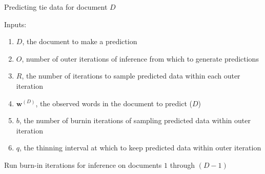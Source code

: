         \begin{algorithm}[H]
        	\SetAlgoLined
        	\caption{Predicting tie data for document $D$}
       	Inputs:
       	\begin{enumerate}
       		\item $D$, the document to make a prediction
       		\item $O$, number of outer iterations of inference from which to generate predictions
       		\item $R$, the number of iterations to sample predicted data within each outer iteration
       		\item $\boldsymbol{w}^{(D)}$, the observed words in the document to predict ($D$)
       		\item $b$, the number of burnin iterations of sampling predicted data within outer iteration
       		\item $q$, the thinning interval at which to keep predicted data within outer iteration
       	\end{enumerate}
       	Run burn-in iterations for inference on documents $1$ through $(D-1)$\\
\end{algorithm}
